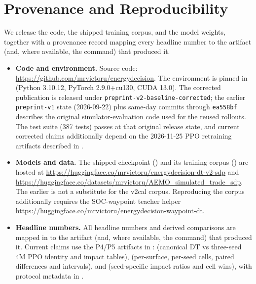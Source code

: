 \documentclass{article}
\begin{document}
\section{Provenance and Reproducibility}

We release the code, the shipped training corpus, and the model weights,
together with a provenance record mapping every headline number to the artifact
(and, where available, the command) that produced it.

\begin{itemize}
  \item \textbf{Code and environment.} Source code:
  \url{https://github.com/mrvictoru/energydecision}. The environment is pinned
  in  (Python 3.10.12, PyTorch 2.9.0+cu130, CUDA
  13.0). The corrected publication is released under
  \texttt{preprint-v2-baseline-corrected}; the earlier \texttt{preprint-v1}
  state (2026-09-22) plus same-day commits through \texttt{ea558bf} describes the
  original simulator-evaluation code used for the reused rollouts. The test suite
  (387 tests) passes at that original release state, and current corrected claims
  additionally depend on the 2026-11-25 PPO retraining artifacts described in
  .
  \item \textbf{Models and data.} The shipped checkpoint
  () and its training corpus
  () are hosted at
  \url{https://huggingface.co/mrvictoru/energydecision-dt-v2-sdp} and
  \url{https://huggingface.co/datasets/mrvictoru/AEMO_simulated_trade_sdp}.
  The earlier  is not a
  substitute for the v2cal corpus. Reproducing the corpus additionally requires
  the SOC-waypoint teacher helper
  \url{https://huggingface.co/mrvictoru/energydecision-waypoint-dt}.
  \item \textbf{Headline numbers.} All headline numbers and derived comparisons
  are mapped in  to the artifact (and, where
  available, the command) that produced it. Current claims use the P4/P5
  artifacts in :
   (canonical DT vs three-seed
  4M PPO identity and impact tables),
   (per-surface, per-seed cells, paired
  differences and intervals), and
   (seed-specific impact ratios and
  cell wins), with protocol metadata in .

\end{itemize}
\end{document}
